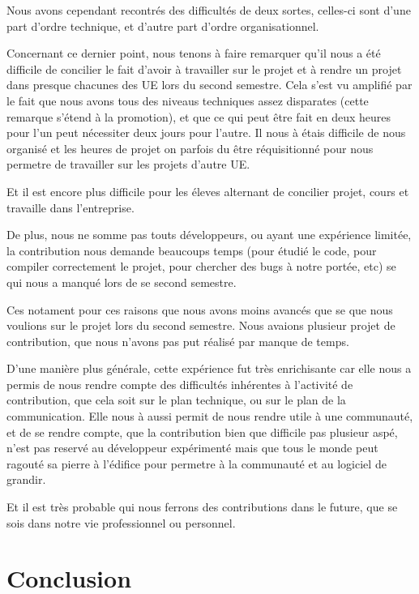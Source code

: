 \documentclass[12pt]{report}
\begin{document}
Nous avons cependant recontrés des difficultés de deux sortes,
celles-ci sont d'une part d'ordre technique, et d'autre part d'ordre
organisationnel.

Concernant ce dernier point, nous tenons à faire remarquer qu'il nous
a été difficile de concilier le fait d'avoir à travailler sur le projet
et à rendre un projet dans presque chacunes des UE lors du second semestre.
Cela s'est vu amplifié par le fait que nous avons tous des niveaus techniques
assez disparates (cette remarque s'étend à la promotion), et que ce qui peut
être fait en deux heures pour l'un peut nécessiter deux jours pour
l'autre.
Il nous à étais difficile de nous organisé et les heures de projet on parfois
du être réquisitionné pour nous permetre de travailler sur les projets d'autre
UE.

Et il est encore plus difficile pour les éleves alternant de concilier projet,
cours et travaille dans l'entreprise.

De plus, nous ne somme pas touts développeurs, ou ayant une expérience
limitée, la contribution nous demande beaucoups temps (pour étudié le code,
pour compiler correctement le projet, pour chercher des bugs à notre portée,
etc) se qui nous a manqué lors de se second semestre.

Ces notament pour ces raisons que nous avons moins avancés que se
que nous voulions sur le projet lors du second semestre.
Nous avaions plusieur projet de contribution, que nous n'avons pas put
réalisé par manque de temps.

D'une manière plus générale, cette expérience fut très enrichisante car elle
nous a permis de nous rendre compte des difficultés inhérentes à
l'activité de contribution, que cela soit sur le plan technique, ou
sur le plan de la communication.
Elle nous à aussi permit de nous rendre utile à une communauté, et de se
rendre compte, que la contribution bien que difficile pas plusieur aspé,
n'est pas reservé au développeur expérimenté mais que tous le monde peut
ragouté sa pierre à l'édifice pour permetre à la communauté et au logiciel
de grandir.

Et il est très probable qui nous ferrons des contributions dans le future,
que se sois dans notre vie professionnel ou personnel.

\chapter{Conclusion}
\end{document}
